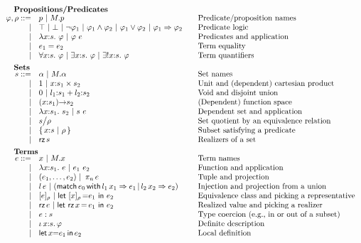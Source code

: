 \begin{figure}
	\[
	\begin{array}{rl@{\qquad}l}
		\noalign{\textbf{Propositions/Predicates}}
		\ip,\ipp ::= 
		    & \iP \ibar \iselect{\im}{\iP}&\mbox{Predicate/proposition names}\\
		  | & \itrue \ | \ \ifalse \ibar \inot{\ip_1} \ibar \iand{\ip_1}{\ip_2} \ibar 
		       \ior{\ip_1}{\ip_2}\ | \ \iimply{\ip_1}{\ip_2} & \mbox{Predicate logic}\\
		  | & \ilambda{\ix}{\is}{\ip}  \ibar \iapp{\ip}{\ie} & \mbox{Predicates and application}\\
		  | & \iequal{\ie_1}{\ie_2} & \mbox{Term equality}\\
		  | & \iforall{\ix}{\is}{\ip}  \ibar 
		      \iexists{\ix}{\is}{\ip} \ |\
		      \iunique{\ix}{\is}{\ip} & \mbox{Term quantifiers}\\[5pt]
		
		\noalign{\textbf{Sets}}
		\is ::= 
		    & \iS  \ibar \iselect{\im}{\iS} &\mbox{Set names}\\
		  | & \isunit \ibar \iprod{\ix}{\is_1}{\is_2}
                  &\mbox{Unit and (dependent) cartesian product}\\
		  | & \isvoid \ibar \isum{\il_1}{\is_1}{\il_2}{\is_2} &\mbox{Void and disjoint union}\\
		  | & \idarrow{\ix}{\is_1}{\is_2} & \mbox{(Dependent) function space} \\
		  | & \ilambda{\ix}{\is_1}{\is_2} \ibar 
		      \iapp{\is}{\ie} &\mbox{Dependent set and application}\\
		  | & \iquot{\is}{\ipp} & \mbox{Set quotient by an equivalence relation}\\
		  | & \isubset{\ix}{\is}{\ipp} & \mbox{Subset satisfying a predicate}\\
		  | & \irz{\is}&\mbox{Realizers of a set}\\[5pt] 
		
		\noalign{\textbf{Terms}}	
		\ie ::=
		    & \ix \ibar \iselect{\im}{\ix} &\mbox{Term names}\\
		  | & \ilambda{\ix}{\is_1}{\ie} \ibar 
		      \iapp{\ie_1}{\ie_2} &\mbox{Function and application}\\
		  | & \ituple{\ie_1}{\ie_2} 
		      \ibar \iproj{\ie}{n}&\mbox{Tuple and projection}\\
		  | & \iinj{\il}{\ie} 
		      \ibar (\imatch{\ie_0}{\il_1}{\ix_1}{\ie_1}{\il_2}{\ix_2}{\ie_2})&\mbox{Injection and projection from a union}\\
		  | & \ieclass{\ie}{\ipp}
		      \ibar \ileteclass{\ix}{\ipp}{\ie_1}{\ie_2}&\mbox{Equivalence class and picking a representative}\\
		  | & \irz{\ie}
		      \ibar \iletrz{\ix}{\ie_1}{\ie_2}&\mbox{Realized value and picking a realizer}\\
		  | & \iconstrain{\ie}{\is}&\mbox{Type coercion (e.g., in or out of a subset)}\\
		  | & \ithe{\ix}{\is}{\ip}&\mbox{Definite description}\\
		  | & \ilet{\ix}{\ie_1}{\ie_2}&\mbox{Local definition}\\[5pt]
		

\end{array}\]
\end{figure}
